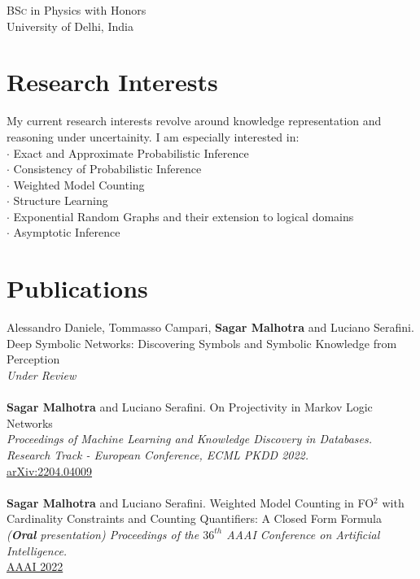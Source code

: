 \documentclass[10pt, a4paper]{article}
\newcommand{\years}[1]{\marginnote{\scriptsize #1}}
\begin{document}
\years{2015-2012}\textsc{BSc} in Physics with Honors\\
University of Delhi, India



\section*{Research Interests}
My current research interests revolve around knowledge representation and reasoning under uncertainity. I am especially interested in:\\

$\cdot$ Exact and Approximate Probabilistic Inference  \\
$\cdot$ Consistency of Probabilistic Inference \\
$\cdot$ Weighted Model Counting\\
$\cdot$ Structure Learning\\
$\cdot$ Exponential Random Graphs and their extension to logical domains\\
$\cdot$ Asymptotic Inference


\section*{Publications}

\noindent

\years{2022} Alessandro Daniele, Tommasso Campari, \textbf{Sagar Malhotra} and Luciano Serafini. \\ Deep Symbolic Networks: Discovering Symbols and Symbolic Knowledge from Perception \\ \emph{Under Review} \\ \\
\years{2022}\textbf{Sagar Malhotra} and Luciano Serafini. On Projectivity in Markov Logic Networks \\ \emph{Proceedings of Machine Learning and Knowledge Discovery in Databases. Research Track - European Conference, ECML PKDD 2022.} \\
\href{https://arxiv.org/pdf/2204.04009.pdf}{arXiv:2204.04009} \\ \\ 
\years{2022}\textbf{Sagar Malhotra} and Luciano Serafini. Weighted Model Counting in FO$^2$ with Cardinality Constraints and Counting Quantifiers: A Closed Form Formula \\ \emph{(\textbf{Oral} presentation) Proceedings of the $36^{th}$ AAAI Conference on Artificial Intelligence.}\\ \href{https://ojs.aaai.org/index.php/AAAI/article/view/20525}{AAAI 2022} \\
\end{document}
